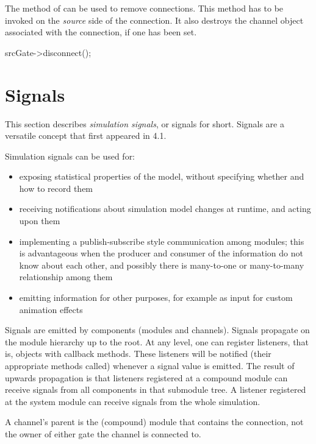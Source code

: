 The  method of  can be
used to remove connections. This method has to be invoked
on the \textit{source} side of the connection. It also destroys
the channel object associated with the connection, if one has been set.

\begin{cpp}
srcGate->disconnect();
\end{cpp}



\section{Signals}
\label{sec:simple-modules:signals}

This section describes \textit{simulation signals}, or signals for short.
Signals are a versatile concept that first appeared in {\opp} 4.1.

Simulation signals can be used for:

\begin{itemize}
  \item exposing statistical properties of the model, without specifying
        whether and how to record them
  \item receiving notifications about simulation model changes at runtime, and
        acting upon them
  \item implementing a publish-subscribe style communication among modules;
        this is advantageous when the producer and consumer of the information
        do not know about each other, and possibly there is many-to-one or
        many-to-many relationship among them
  \item emitting information for other purposes, for example as input for
        custom animation effects
\end{itemize}

Signals are emitted by components (modules and channels). Signals propagate on
the module hierarchy up to the root. At any level, one can register listeners,
that is, objects with callback methods. These listeners will be notified (their
appropriate methods called) whenever a signal value is emitted. The result of
upwards propagation is that listeners registered at a compound module can
receive signals from all components in that submodule tree. A listener
registered at the system module can receive signals from the whole simulation.

\begin{note}
    A channel's parent is the (compound) module that contains the connection,
    not the owner of either gate the channel is connected to.
\end{note}


